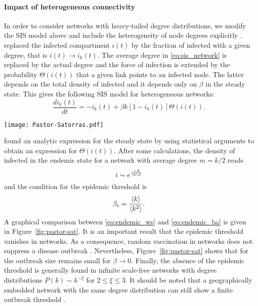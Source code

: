 \paragraph{Impact of heterogeneous connectivity\color{Cayenne}{.}}
In order to consider networks with heavy-tailed degree distributions, we modify the SIS model above and include the heterogeneity of node degrees explicitly \citep{Pastor-Satorras_vespi:2001}.
\citeauthor{Pastor-Satorras_vespi:2001} replaced the infected compartment $i(t)$ by the fraction of infected with a given degree, that is $i(t)\rightarrow i_k(t)$.
The average degree in \eqref{eq:sis_network} is replaced by the actual degree and the force of infection is extended by the probability $\Theta (i(t))$ that a given link points to an infected node.
The latter depends on the total density of infected and it depends only on $\beta $ in the steady state.
This gives the following SIS model for heterogeneous networks:
\begin{equation}\label{eq:sis_het_network}
\frac{di_k(t)}{dt}=-i_k(t)+\beta k [1-i_k(t)] \Theta (i(t)).
\end{equation}
%
\begin{SCfigure}
\texttt{[image: Pastor-Satorras.pdf]}
\caption{Fraction of infected in the endemic state for an SIS model.
The figure reveals the disappearance of the epidemic threshold for in \BA networks (red).
The epidemic threshold remains finite (here: $\beta _c=1/6$) for homogeneous networks and $\beta _c \rightarrow 0$ for \BA networks.
}
\label{fig:pastor-sat}
\end{SCfigure}

%
\citeauthor{Pastor-Satorras_vespi:2001} found an analytic expression for the steady state by using statistical arguments to obtain an expression for $\Theta (i(t))$.
After some calculations, the density of infected in the endemic state for a \BA network with average degree $m=k/2$ reads
\begin{equation}\label{eq:endemic_ba}
i \sim e^{\frac{-2}{\left< k \right>\beta }}
\end{equation}
and the condition for the epidemic threshold is \citep{pastor-sat_2}
\begin{equation}\label{eq:degree_threshold}
\beta _c=\frac{\left< k \right>}{\left< k^2 \right>} .
\end{equation}
A graphical comparison between \eqref{eq:endemic_ws} and \eqref{eq:endemic_ba} is given in Figure~\ref{fig:pastor-sat}.
It is an important result that the epidemic threshold vanishes in \BA networks.
As a consequence, random vaccination in \BA networks does not suppress a disease outbreak \citep{Keeling:2005}.
Nevertheless, Figure~\ref{fig:pastor-sat} shows that for the outbreak size remains small for $\beta \rightarrow 0$.
Finally, the absence of the epidemic threshold is generally found in infinite scale-free networks with degree distributions $P(k)\sim k^{-\xi }$ for $2\leqslant \xi \leqslant 3$.
It should be noted that a geographically embedded network with the same degree distribution can still show a finite outbreak threshold \citep{Sander20031}.


